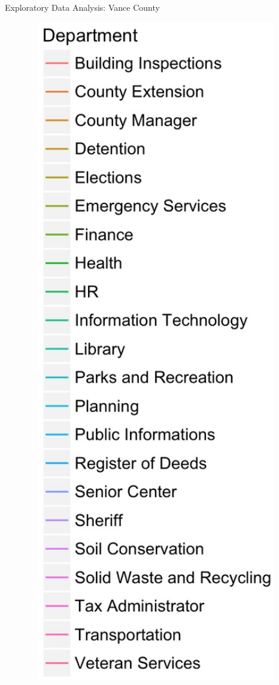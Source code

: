 \documentclass[10pt]{beamer}
\theoremstyle{definition}
\theoremstyle{remark}
\begin{document}
\begin{frame}{Exploratory Data Analysis: Vance County}
\begin{minipage}{0.85\linewidth}
\begin{figure}
	 		 		 \end{figure}	
\end{minipage} 
\begin{minipage}{0.13\linewidth}
		 \begin{figure}
	 		 		 	\includegraphics[width=1.25\textwidth]{figures/Dept2.jpg}
	 \end{figure}	
	\end{minipage}
\end{frame}
\end{document}
